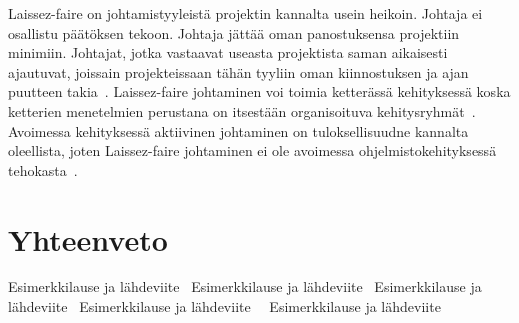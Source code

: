 \documentclass[finnish]{tktltiki2}
\theoremstyle{definition}
\theoremstyle{remark}
\begin{document}
Laissez-faire on johtamistyyleistä projektin kannalta usein heikoin. Johtaja ei osallistu päätöksen tekoon. Johtaja jättää oman panostuksensa projektiin minimiin. Johtajat, jotka vastaavat useasta projektista saman aikaisesti ajautuvat, joissain projekteissaan tähän tyyliin oman kiinnostuksen ja ajan puutteen takia~\cite{Dhomne:2012:ITL:2382887.2382899}. Laissez-faire johtaminen voi toimia ketterässä kehityksessä koska ketterien menetelmien perustana on itsestään organisoituva kehitysryhmät~\cite{fowler2001agile}. Avoimessa kehityksessä aktiivinen johtaminen on tuloksellisuudne kannalta oleellista, joten Laissez-faire johtaminen ei ole avoimessa ohjelmistokehityksessä tehokasta~\cite{Li:2006:MOS:1125170.1125182}.



\section{Yhteenveto}







 





Esimerkkilause ja lähdeviite~\cite{Zhang:2011:ECL:2047594.2047666}
Esimerkkilause ja lähdeviite~\cite{Dhomne:2012:ITL:2382887.2382899}
Esimerkkilause ja lähdeviite~\cite{Augustine:2005:APM:1101779.1101781}
Esimerkkilause ja lähdeviite~\cite{Chow2008961}~\cite{Li:2006:MOS:1125170.1125182}
Esimerkkilause ja lähdeviite~\cite{4755768}





%

%
% 
%



\end{document}
